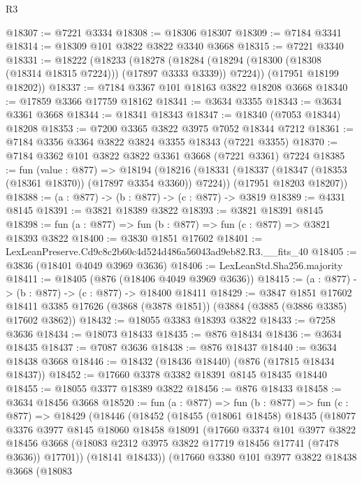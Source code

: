 \begin{lexlean}{R3}
\begin{coremodule}
@18307 := @7221 @3334
@18308 := @18306 @18307
@18309 := @7184 @3341
@18314 := @18309 @101 @3822 @3822 @3340 @3668
@18315 := @7221 @3340
@18331 := @18222
    (@18233
      (@18278 (@18284 (@18294 (@18300 (@18308 (@18314 @18315 @7224))) (@17897 @3333 @3339)) @7224))
      (@17951 @18199 @18202))
@18337 := @7184 @3367 @101 @18163 @3822 @18208 @3668
@18340 := @17859 @3366 @17759 @18162
@18341 := @3634 @3355
@18343 := @3634 @3361 @3668
@18344 := @18341 @18343
@18347 := @18340 (@7053 @18344) @18208
@18353 := @7200 @3365 @3822 @3975 @7052 @18344 @7212
@18361 := @7184 @3356 @3364 @3822 @3824 @3355 @18343 (@7221 @3355)
@18370 := @7184 @3362 @101 @3822 @3822 @3361 @3668 (@7221 @3361) @7224
@18385 := fun (value : @877) =>
  @18194
    (@18216
      (@18331 (@18337 (@18347 (@18353 (@18361 @18370)) (@17897 @3354 @3360)) @7224))
      (@17951 @18203 @18207))
@18388 := (a : @877) -> (b : @877) -> (c : @877) -> @3819
@18389 := @4331 @8145
@18391 := @3821 @18389 @3822
@18393 := @3821 @18391 @8145
@18398 := fun (a : @877) => fun (b : @877) => fun (c : @877) => @3821 @18393 @3822
@18400 := @3830 @1851 @17602
@18401 := LexLeanPreserve.Cd9c8c2b60c4d524d486a56043ad9eb82.R3.__fits_40
@18405 := @3836 (@18401 @4049 @3969 @3636)
@18406 := LexLeanStd.Sha256.majority
@18411 := @18405 (@876 (@18406 @4049 @3969 @3636))
@18415 := (a : @877) -> (b : @877) -> (c : @877) -> @18400 @18411
@18429 := @3847
    @1851
    @17602
    @18411
    @3385
    @17626
    (@3868 (@3878 @1851))
    (@3884 (@3885 (@3886 @3385) @17602 @3862))
@18432 := @18055 @3383 @18393 @3822
@18433 := @7258 @3636
@18434 := @18073 @18433
@18435 := @876 @18434
@18436 := @3634 @18435
@18437 := @7087 @3636
@18438 := @876 @18437
@18440 := @3634 @18438 @3668
@18446 := @18432 (@18436 @18440) (@876 (@17815 @18434 @18437))
@18452 := @17660 @3378 @3382 @18391 @8145 @18435 @18440
@18455 := @18055 @3377 @18389 @3822
@18456 := @876 @18433
@18458 := @3634 @18456 @3668
@18520 := fun (a : @877) =>
  fun (b : @877) =>
  fun (c : @877) =>
  @18429
    (@18446
      (@18452
        (@18455
          (@18061 @18458)
          @18435
          (@18077
            @3376
            @3977
            @8145
            @18060
            @18458
            @18091
            (@17660
              @3374
              @101
              @3977
              @3822
              @18456
              @3668
              (@18083 @2312 @3975 @3822 @17719 @18456 @17741 (@7478 @3636))
              @17701))
          (@18141 @18433))
        (@17660
          @3380
          @101
          @3977
          @3822
          @18438
          @3668
          (@18083

\end{coremodule}
\end{lexlean}
